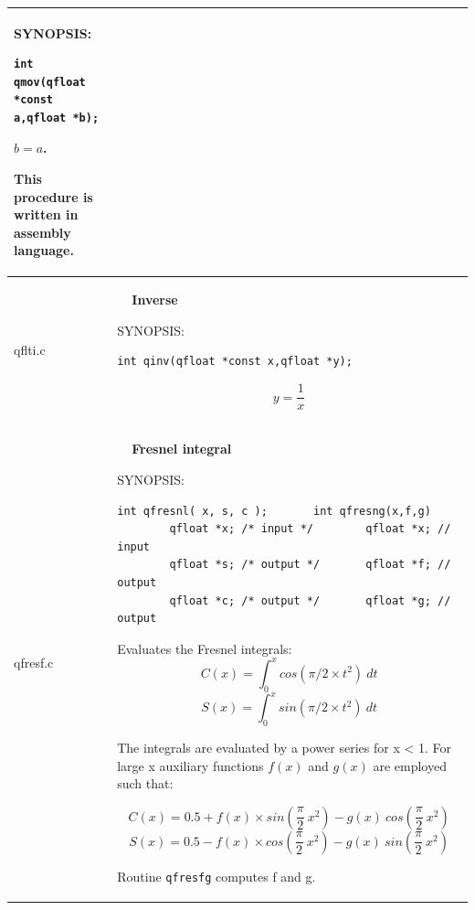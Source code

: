 \documentclass[10pt,a4paper,x11names]{memoir} %
\newcounter{entry}
\newcommand{\TOC}[1] {\addcontentsline{toc}{section}{\theentry\ \  #1} \textbf{\theentry\ \  #1} \par\stepcounter{entry}}
\begin{document}
\begin{longtable}{|p{1.5cm}|p{11.5cm}|}
	{\footnotesize SYNOPSIS:}\vspace{-0.2cm}\index{qmov}
	\begin{lstlisting}[numbers=none]
		int qmov(qfloat *const a,qfloat *b);
	\end{lstlisting}\vspace{-0.2cm}
	$b=a$.\par
	This procedure is written in assembly language.
	\\\hline
	qflti.c&\TOC{Inverse}
	{\footnotesize SYNOPSIS:}\vspace{-0.2cm}\index{qmov}
	\begin{lstlisting}[numbers=none]
		int qinv(qfloat *const x,qfloat *y);
	\end{lstlisting}\vspace{-0.2cm}
	$$y=\frac{1}{x}$$
	\\\hline
	qfresf.c& \TOC{Fresnel integral}
	
	{\footnotesize SYNOPSIS:}\vspace{-0.2cm}\index{qfresnl}
	\begin{lstlisting}[numbers=none]
		int qfresnl( x, s, c );       int qfresng(x,f,g)
		qfloat *x; /* input */        qfloat *x; // input
		qfloat *s; /* output */       qfloat *f; // output
		qfloat *c; /* output */       qfloat *g; // output
	\end{lstlisting}\vspace{-0.2cm}
	Evaluates the Fresnel integrals:
	$$C(x)=\int_{0}^{x}cos\left(\pi/2 \times t^2\right)\ dt$$
	$$S(x)=\int_{0}^{x}sin\left(\pi/2 \times t^2\right)\ dt$$
	
	The integrals are evaluated by a power series for x < 1.
	For large x auxiliary functions $f(x)$ and $g(x)$ are employed
	such that:
	
	$$C(x) = 0.5 + f(x)\times sin\left( \frac{\pi}{2}\  x^2 \right) - g(x)\ cos\left( \frac{\pi}{2} \  x^2 \right)$$
	$$S(x) = 0.5 - f(x)\times cos\left( \frac{\pi}{2}\  x^2 \right) - g(x)\ sin\left( \frac{\pi}{2} \  x^2 \right)$$
	
	Routine \verb,qfresfg, computes f and g.
	

\end{longtable}
\end{document}
